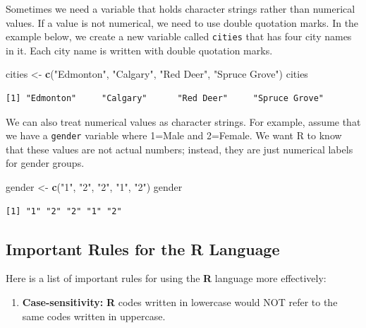 \documentclass[]{book}
\newenvironment{Shaded}{\begin{snugshade}}{\end{snugshade}}
\newcommand{\KeywordTok}[1]{\textcolor[rgb]{0.13,0.29,0.53}{\textbf{#1}}}
\newcommand{\NormalTok}[1]{#1}
\newcommand{\StringTok}[1]{\textcolor[rgb]{0.31,0.60,0.02}{#1}}
\providecommand{\tightlist}{%
  \setlength{\itemsep}{0pt}\setlength{\parskip}{0pt}}
\begin{document}
Sometimes we need a variable that holds character strings rather than numerical values. If a value is not numerical, we need to use double quotation marks. In the example below, we create a new variable called \texttt{cities} that has four city names in it. Each city name is written with double quotation marks.

\begin{Shaded}
\begin{Highlighting}[]
\NormalTok{cities <-}\StringTok{ }\KeywordTok{c}\NormalTok{(}\StringTok{"Edmonton"}\NormalTok{, }\StringTok{"Calgary"}\NormalTok{, }\StringTok{"Red Deer"}\NormalTok{, }\StringTok{"Spruce Grove"}\NormalTok{)}
\NormalTok{cities}
\end{Highlighting}
\end{Shaded}

\begin{verbatim}
[1] "Edmonton"     "Calgary"      "Red Deer"     "Spruce Grove"
\end{verbatim}

We can also treat numerical values as character strings. For example, assume that we have a \texttt{gender} variable where 1=Male and 2=Female. We want R to know that these values are not actual numbers; instead, they are just numerical labels for gender groups.

\begin{Shaded}
\begin{Highlighting}[]
\NormalTok{gender <-}\StringTok{ }\KeywordTok{c}\NormalTok{(}\StringTok{"1"}\NormalTok{, }\StringTok{"2"}\NormalTok{, }\StringTok{"2"}\NormalTok{, }\StringTok{"1"}\NormalTok{, }\StringTok{"2"}\NormalTok{)}
\NormalTok{gender}
\end{Highlighting}
\end{Shaded}

\begin{verbatim}
[1] "1" "2" "2" "1" "2"
\end{verbatim}

\hypertarget{important-rules-for-the-r-language}{%
\subsection{\texorpdfstring{Important Rules for the \textbf{R} Language}{Important Rules for the R Language}}\label{important-rules-for-the-r-language}}

Here is a list of important rules for using the \textbf{R} language more effectively:

\begin{enumerate}
\def\labelenumi{\arabic{enumi}.}
\tightlist
\item
  \textbf{Case-sensitivity:} \textbf{R} codes written in lowercase would NOT refer to the same codes written in uppercase.
\end{enumerate}
\end{document}
